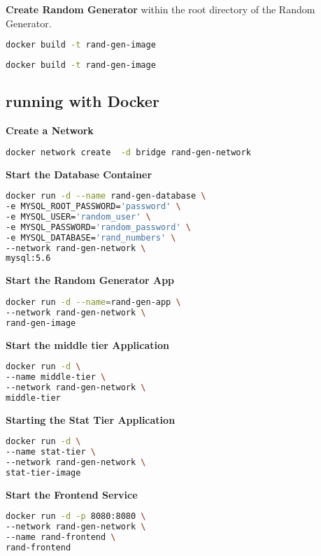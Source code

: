 \textbf{Create Random Generator}
within the root directory of the Random Generator.
\begin{lstlisting}[language=Bash]
docker build -t rand-gen-image
\end{lstlisting}

\begin{lstlisting}[language=Bash]
docker build -t rand-gen-image
\end{lstlisting}


\subsection{running with Docker}

\textbf{Create a Network}
\begin{lstlisting}[language=Bash]
docker network create  -d bridge rand-gen-network
\end{lstlisting}

\textbf{Start the Database Container}

\begin{lstlisting}[language=Bash]
docker run -d --name rand-gen-database \
-e MYSQL_ROOT_PASSWORD='password' \
-e MYSQL_USER='random_user' \
-e MYSQL_PASSWORD='random_password' \
-e MYSQL_DATABASE='rand_numbers' \
--network rand-gen-network \
mysql:5.6
\end{lstlisting}

\textbf{Start the Random Generator App}
\begin{lstlisting}[language=Bash]
docker run -d --name=rand-gen-app \
--network rand-gen-network \
rand-gen-image
\end{lstlisting}

\textbf{Start the middle tier Application}
\begin{lstlisting}[language=Bash]
docker run -d \
--name middle-tier \
--network rand-gen-network \
middle-tier
\end{lstlisting}

\textbf{Starting the Stat Tier Application}
\begin{lstlisting}[language=Bash]
docker run -d \
--name stat-tier \
--network rand-gen-network \ 
stat-tier-image
\end{lstlisting}

\textbf{Start the Frontend Service}
\begin{lstlisting}[language=Bash]
docker run -d -p 8080:8080 \
--network rand-gen-network \
--name rand-frontend \
rand-frontend
\end{lstlisting}